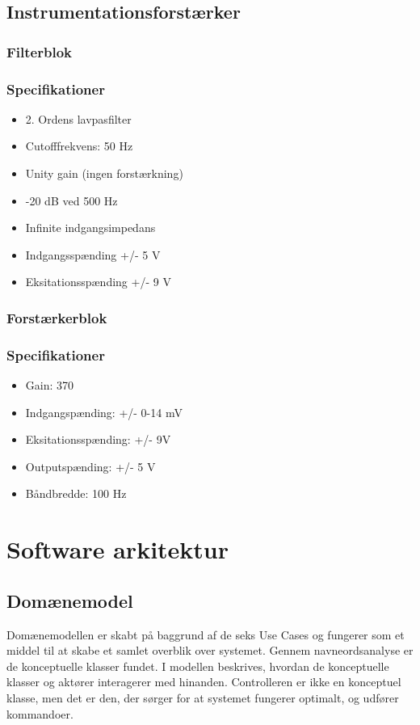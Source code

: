  \subsection{Instrumentationsforstærker}
 
 
 \subsubsection{Filterblok}
 \subsubsection{Specifikationer}
 \begin{itemize}
 	\item 2. Ordens lavpasfilter
 	\item Cutofffrekvens: 50 Hz
 	\item Unity gain (ingen forstærkning)
 	\item -20 dB ved 500 Hz
 	\item Infinite indgangsimpedans
 	\item Indgangsspænding +/- 5 V
 	\item Eksitationsspænding +/- 9 V
 \end{itemize}
 
  
 
 \subsubsection{Forstærkerblok}
 \subsubsection{Specifikationer}
 \begin{itemize}
 	\item Gain: 370
 	\item Indgangspænding: +/- 0-14 mV
 	\item Eksitationsspænding: +/- 9V
 	\item Outputspænding: +/- 5 V
 	\item Båndbredde: 100 Hz
 \end{itemize}

\section{Software arkitektur}

\subsection{Domænemodel}
Domænemodellen er skabt på baggrund af de seks Use Cases og fungerer som et middel til at skabe et samlet overblik over systemet. Gennem navneordsanalyse er de konceptuelle klasser fundet. I modellen beskrives, hvordan de konceptuelle klasser og aktører interagerer med hinanden. Controlleren er ikke en konceptuel klasse, men det er den, der sørger for at systemet fungerer optimalt, og udfører kommandoer.

